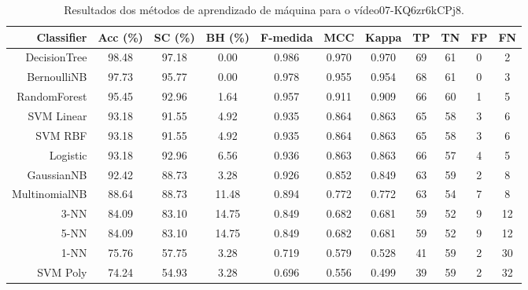\begin{table}[!htb]
\centering
\caption{Resultados dos métodos de aprendizado de máquina para o vídeo07-KQ6zr6kCPj8.}
\label{tab:07-KQ6zr6kCPj8}
\begin{tabular}{r|c|c|c|c|c|c|c|c|c|c}
\hline\hline
Classifier & Acc (\%) & SC (\%) & BH (\%) & F-medida & MCC & Kappa & TP & TN & FP & FN \\ \hline
DecisionTree & 98.48 & 97.18 & 0.00 & 0.986 & 0.970 & 0.970 & 69 & 61 & 0 & 2 \\ 
BernoulliNB & 97.73 & 95.77 & 0.00 & 0.978 & 0.955 & 0.954 & 68 & 61 & 0 & 3 \\ 
RandomForest & 95.45 & 92.96 & 1.64 & 0.957 & 0.911 & 0.909 & 66 & 60 & 1 & 5 \\ 
SVM Linear & 93.18 & 91.55 & 4.92 & 0.935 & 0.864 & 0.863 & 65 & 58 & 3 & 6 \\ 
SVM RBF & 93.18 & 91.55 & 4.92 & 0.935 & 0.864 & 0.863 & 65 & 58 & 3 & 6 \\ 
Logistic & 93.18 & 92.96 & 6.56 & 0.936 & 0.863 & 0.863 & 66 & 57 & 4 & 5 \\ 
GaussianNB & 92.42 & 88.73 & 3.28 & 0.926 & 0.852 & 0.849 & 63 & 59 & 2 & 8 \\ 
MultinomialNB & 88.64 & 88.73 & 11.48 & 0.894 & 0.772 & 0.772 & 63 & 54 & 7 & 8 \\ 
3-NN & 84.09 & 83.10 & 14.75 & 0.849 & 0.682 & 0.681 & 59 & 52 & 9 & 12 \\ 
5-NN & 84.09 & 83.10 & 14.75 & 0.849 & 0.682 & 0.681 & 59 & 52 & 9 & 12 \\ 
1-NN & 75.76 & 57.75 & 3.28 & 0.719 & 0.579 & 0.528 & 41 & 59 & 2 & 30 \\ 
SVM Poly & 74.24 & 54.93 & 3.28 & 0.696 & 0.556 & 0.499 & 39 & 59 & 2 & 32 \\ 
\hline\hline
\end{tabular}
\end{table}
